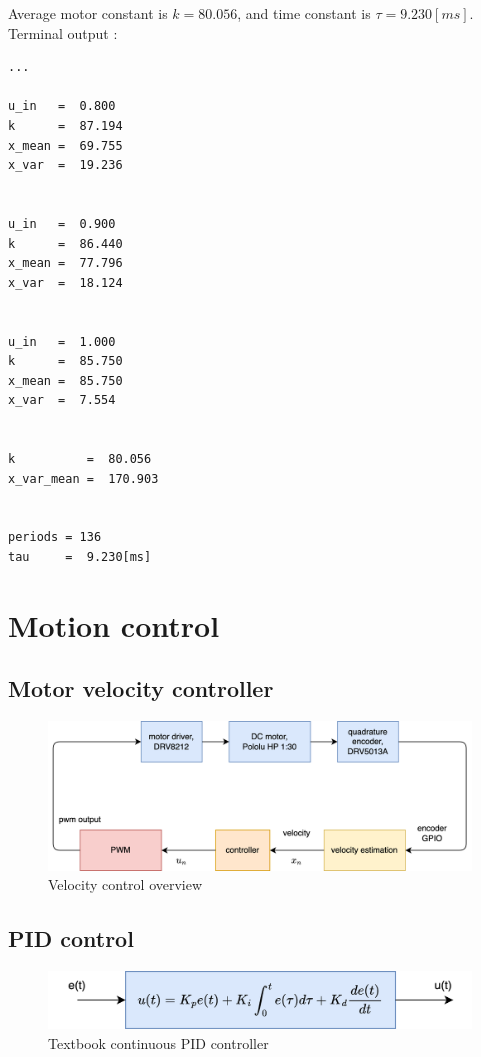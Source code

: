 \documentclass[12pt,twoside,onecolumn,openany,extrafontsizes,dvipsnames]{memoir}
\begin{document}
        \newpage
        Average motor constant is $k = 80.056$, and time constant is $\tau = 9.230[ms]$.
        Terminal output :
        \begin{lstlisting}[style=terminal_style]
...

u_in   =  0.800
k      =  87.194
x_mean =  69.755
x_var  =  19.236


u_in   =  0.900
k      =  86.440
x_mean =  77.796
x_var  =  18.124


u_in   =  1.000
k      =  85.750
x_mean =  85.750
x_var  =  7.554


k          =  80.056
x_var_mean =  170.903


periods = 136
tau     =  9.230[ms]
        \end{lstlisting}

        

\newpage
\chapter{Motion control}

    \section{Motor velocity controller}

        \begin{figure}[!htb]
            \centering
            \includegraphics[scale=0.6]{../diagrams/control_generic/control_generic-motor_control.png}
            \caption{Velocity control overview}
            \label{fig:velocity_control_overview}
        \end{figure}


        \newpage
        \section{PID control}

            \begin{figure}[!htb]
                \centering
                \includegraphics[scale=0.8]{../diagrams/control_generic/control_generic-pid.png}
                \caption{Textbook continuous PID controller}
                \label{fig:textbook_continuous_pid_controller}
            \end{figure}
\end{document}
